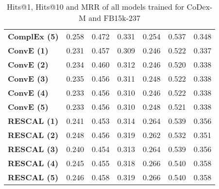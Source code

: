 \begin{table}[H]
\begin{tabular}{l|lll|lll}
\textbf{ComplEx (5)} & 0.258       & 0.472      & 0.331      & 0.254       & 0.537       & 0.348      \\
\textbf{ConvE (1)}   & 0.231       & 0.457      & 0.309      & 0.246       & 0.522       & 0.337      \\
\textbf{ConvE (2)}   & 0.234       & 0.460      & 0.312      & 0.246       & 0.520       & 0.338      \\
\textbf{ConvE (3)}   & 0.235       & 0.456      & 0.311      & 0.248       & 0.522       & 0.338      \\
\textbf{ConvE (4)}   & 0.233       & 0.456      & 0.310      & 0.246       & 0.522       & 0.338      \\
\textbf{ConvE (5)}   & 0.233       & 0.456      & 0.310      & 0.248       & 0.521       & 0.338      \\
\textbf{RESCAL (1)}  & 0.241       & 0.453      & 0.314      & 0.264       & 0.539       & 0.356      \\
\textbf{RESCAL (2)}  & 0.248       & 0.456      & 0.319      & 0.262       & 0.532       & 0.351      \\
\textbf{RESCAL (3)}  & 0.240       & 0.454      & 0.313      & 0.264       & 0.539       & 0.356      \\
\textbf{RESCAL (4)}  & 0.245       & 0.455      & 0.318      & 0.266       & 0.540       & 0.358      \\
\textbf{RESCAL (5)}  & 0.246       & 0.458      & 0.319      & 0.266       & 0.540       & 0.358     
\end{tabular}
\caption{Hits@1, Hits@10 and MRR of all models trained for CoDex-M and FB15k-237}
\label{tab:metrics_all_codex_fb15l}
\end{table}

